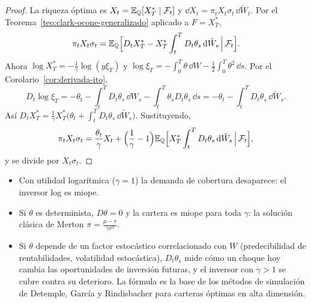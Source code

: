 \begin{proof}
La riqueza óptima es $X_t=\mathbb{E}_{\mathbb{Q}}[X_T^*\mid\mathcal{F}_t]$ y $\dd X_t=\pi_tX_t\sigma_t\,\dd\tilde W_t$. Por el Teorema~\ref{teo:clark-ocone-generalizado}
aplicado a $F=X_T^*$,
\[
  \pi_tX_t\sigma_t=\mathbb{E}_{\mathbb{Q}}\Big[D_tX_T^*-X_T^*\int_t^TD_t\theta_s\,\mathrm{d}\tilde W_s\,\Big|\,\mathcal{F}_t\Big].
\]
Ahora $\log X_T^*=-\frac1\gamma\log(y\xi_T)$ y $\log\xi_T=-\int_0^T\theta\,\dd W-\frac12\int_0^T\theta^2\,\dd s$. Por el Corolario~\ref{cor:derivada-ito},
\[
  D_t\log\xi_T=-\theta_t-\int_t^TD_t\theta_s\,\dd W_s-\int_t^T\theta_sD_t\theta_s\,\dd s=-\theta_t-\int_t^TD_t\theta_s\,\dd\tilde W_s.
\]
Así $D_tX_T^*=\frac1\gamma X_T^*\big(\theta_t+\int_t^TD_t\theta_s\,\dd\tilde W_s\big)$. Sustituyendo,
\[
  \pi_tX_t\sigma_t=\frac{\theta_t}{\gamma}X_t+\Big(\frac1\gamma-1\Big)\mathbb{E}_{\mathbb{Q}}\Big[X_T^*\int_t^TD_t\theta_s\,\mathrm{d}\tilde W_s\,\Big|\,\mathcal{F}_t\Big],
\]
y se divide por $X_t\sigma_t$.
\end{proof}

\begin{observacion}
\begin{itemize}
  \item Con utilidad logarítmica ($\gamma=1$) la demanda de cobertura desaparece:
  el inversor log es miope.
  \item Si $\theta$ es determinista, $D\theta=0$ y la cartera es miope para toda $\gamma$: la solución clásica de
  Merton $\pi=\frac{\mu-r}{\gamma\sigma^2}$.
  \item Si $\theta$ depende de un factor estocástico correlacionado con $W$ (predecibilidad de rentabilidades,
  volatilidad estocástica), $D_t\theta_s$ mide cómo un choque hoy cambia las oportunidades
  de inversión futuras, y el inversor con $\gamma>1$ se cubre contra su deterioro. La fórmula es
  la base de los métodos de simulación de Detemple, García y Rindisbacher para carteras
  óptimas en alta dimensión.
\end{itemize}
\end{observacion}

